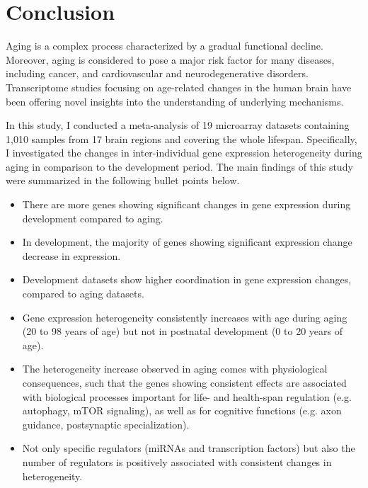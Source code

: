 \chapter{Conclusion}
\label{chp:b5}

Aging is a complex process characterized by a gradual functional decline.
Moreover, aging is considered to pose a major risk factor for many diseases, including cancer, and cardiovascular and neurodegenerative disorders.
Transcriptome studies focusing on age-related changes in the human brain have been offering novel insights into the understanding of underlying mechanisms.

In this study, I conducted a meta-analysis of 19 microarray datasets containing 1,010 samples from 17 brain regions and covering the whole lifespan.
Specifically, I investigated the changes in inter-individual gene expression heterogeneity during aging in comparison to the development period.
The main findings of this study were summarized in the following bullet points below.

\begin{itemize}
    \item There are more genes showing significant changes in gene expression during development compared to aging.
    \item In development, the majority of genes showing significant expression change decrease in expression.
    \item Development datasets show higher coordination in gene expression changes, compared to aging datasets.
    \item Gene expression heterogeneity consistently increases with age during aging (20 to 98 years of age) but not in postnatal development (0 to 20 years of age).
    \item The heterogeneity increase observed in aging comes with physiological consequences, 
    such that the genes showing consistent effects are associated with biological processes important for life- and health-span regulation 
    (e.g. autophagy, mTOR signaling), as well as for cognitive functions (e.g. axon guidance, postsynaptic specialization).
    \item Not only specific regulators (miRNAs and transcription factors) but also the number of regulators is positively associated with consistent changes in heterogeneity. 
\end{itemize}
